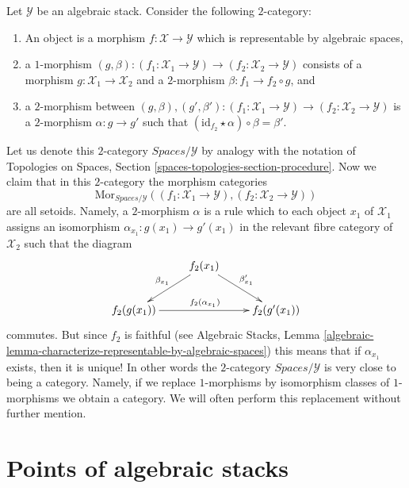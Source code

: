 \begin{remark}
\label{remark-representable-over}
Let $\mathcal{Y}$ be an algebraic stack. Consider the following
$2$-category:
\begin{enumerate}
\item An object is a morphism $f : \mathcal{X} \to \mathcal{Y}$
which is representable by algebraic spaces,
\item a $1$-morphism
$(g, \beta) :
(f_1 : \mathcal{X}_1 \to \mathcal{Y})
\to
(f_2 : \mathcal{X}_2 \to \mathcal{Y})$
consists of a morphism $g : \mathcal{X}_1 \to \mathcal{X}_2$ and a
$2$-morphism $\beta : f_1 \to f_2 \circ g$, and
\item a $2$-morphism between
$(g, \beta), (g', \beta') :
(f_1 : \mathcal{X}_1 \to \mathcal{Y})
\to
(f_2 : \mathcal{X}_2 \to \mathcal{Y})$
is a $2$-morphism $\alpha : g \to g'$ such that
$(\text{id}_{f_2} \star \alpha) \circ \beta = \beta'$.
\end{enumerate}
Let us denote this $2$-category $\textit{Spaces}/\mathcal{Y}$ by
analogy with the notation of
Topologies on Spaces, Section \ref{spaces-topologies-section-procedure}.
Now we claim that in this $2$-category the morphism categories
$$
\text{Mor}_{\textit{Spaces}/\mathcal{Y}}(
(f_1 : \mathcal{X}_1 \to \mathcal{Y}),
(f_2 : \mathcal{X}_2 \to \mathcal{Y}))
$$
are all setoids. Namely, a $2$-morphism $\alpha$ is a rule which to each
object $x_1$ of $\mathcal{X}_1$ assigns an isomorphism
$\alpha_{x_1} : g(x_1) \longrightarrow g'(x_1)$
in the relevant fibre category of $\mathcal{X}_2$ such that the diagram
$$
\xymatrix{
& f_2(x_1) \ar[ld]_{\beta_{x_1}} \ar[rd]^{\beta'_{x_1}} \\
f_2(g(x_1)) \ar[rr]^{f_2(\alpha_{x_1})} & &
f_2(g'(x_1))
}
$$
commutes. But since $f_2$ is faithful (see
Algebraic Stacks,
Lemma \ref{algebraic-lemma-characterize-representable-by-algebraic-spaces})
this means that if $\alpha_{x_1}$ exists, then it is unique! In other words the
$2$-category $\textit{Spaces}/\mathcal{Y}$ is very close to
being a category. Namely, if we replace $1$-morphisms by isomorphism
classes of $1$-morphisms we obtain a category. We will often
perform this replacement without further mention.
\end{remark}




\section{Points of algebraic stacks}
\label{section-points}

